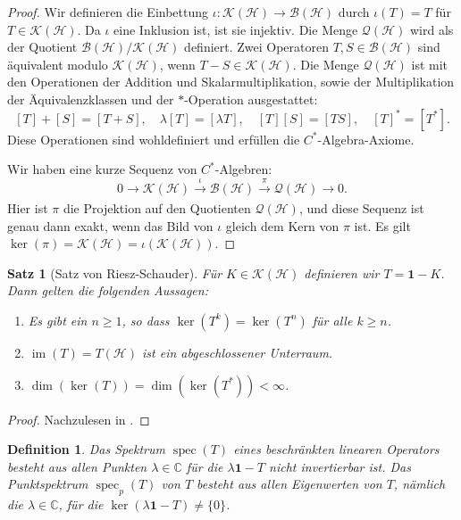 \documentclass[11pt, hidelinks]{article}
\newcommand{\h}{\mathcal{H}}
\newcommand{\spec}{\operatorname{spec}}
\newcommand{\im}{\operatorname{im}}
\numberwithin{conj}{section}
\newtheorem{definition}[conj]{Definition}
\newtheorem{theorem}[conj]{Satz}
\begin{document}
\begin{proof}
Wir definieren die Einbettung $\iota: \mathcal{K}(\mathcal{H}) \to \mathcal{B}(\mathcal{H})$ durch $\iota(T) = T$ für $T \in \mathcal{K}(\mathcal{H})$. Da $\iota$ eine Inklusion ist, ist sie injektiv. Die Menge $\mathcal{Q}(\mathcal{H})$ wird als der Quotient $\mathcal{B}(\mathcal{H}) / \mathcal{K}(\mathcal{H})$ definiert. Zwei Operatoren $T, S \in \mathcal{B}(\mathcal{H})$ sind äquivalent modulo $\mathcal{K}(\mathcal{H})$, wenn $T - S \in \mathcal{K}(\mathcal{H})$. Die Menge $\mathcal{Q}(\mathcal{H})$ ist mit den Operationen der Addition und Skalarmultiplikation, sowie der Multiplikation der Äquivalenzklassen und der $\ast$-Operation ausgestattet:
   \[
   [T] + [S] = [T + S], \quad \lambda[T] = [\lambda T], \quad [T][S] = [TS], \quad [T]^\ast = [T^\ast].
   \]
Diese Operationen sind wohldefiniert und erfüllen die $C^\ast$-Algebra-Axiome.

Wir haben eine kurze Sequenz von $C^\ast$-Algebren:
   \[
   0 \to \mathcal{K}(\mathcal{H}) \xrightarrow[]{\iota} \mathcal{B}(\mathcal{H}) \xrightarrow[]{\pi} \mathcal{Q}(\mathcal{H}) \to 0.
   \]
Hier ist $\pi$ die Projektion auf den Quotienten $\mathcal{Q}(\mathcal{H})$, und diese Sequenz ist genau dann exakt, wenn das Bild von $\iota$ gleich dem Kern von $\pi$ ist. Es gilt $\ker(\pi) = \mathcal{K}(\h) = \iota(\mathcal{K}(\h))$.
\end{proof}

\begin{theorem}[Satz von Riesz-Schauder]
Für $K \in \mathcal{K}(\h)$ definieren wir $T = \mathbf{1}-K$. Dann gelten die folgenden Aussagen:
\begin{enumerate}
    \item Es gibt ein $n \geq 1$, so dass $\ker(T^k) = \ker(T^n)$ für alle $k \geq n$.
    \item $\im(T) = T(\h)$ ist ein abgeschlossener Unterraum.
    \item $\dim(\ker(T)) = \dim(\ker(T^\ast)) < \infty$.
\end{enumerate}
\end{theorem}

\begin{proof}
Nachzulesen in \cite[Satz VI.2.1, Lemma VI.2.2]{werner2018funktionalanalysis}.
\end{proof}

\begin{definition}
    Das Spektrum $\spec(T)$ eines beschränkten linearen Operators besteht aus allen Punkten $\lambda \in \mathbb{C}$ für die $\lambda \mathbf{1} - T$ nicht invertierbar ist. Das Punktspektrum $\spec_p(T)$ von $T$ besteht aus allen Eigenwerten von $T$, nämlich die $\lambda \in \mathbb{C}$, für die $\ker(\lambda \mathbf{1} - T) \neq \{0\}$.
\end{definition}
\end{document}
